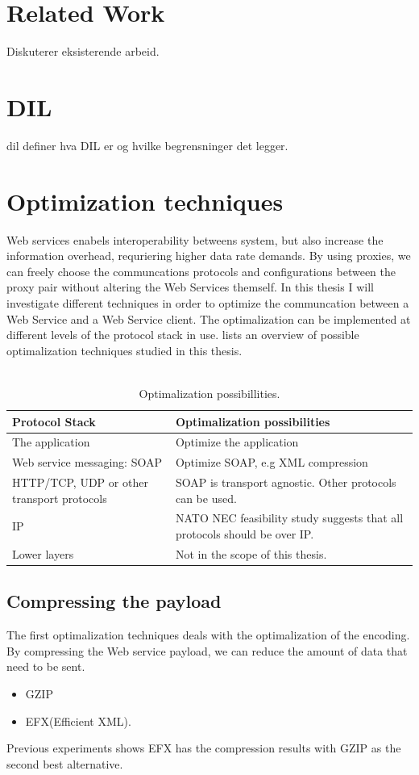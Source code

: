 \documentclass[USenglish]{article}
\begin{document}
\section{Related Work}
Diskuterer eksisterende arbeid.
\section{DIL}
\gls{dil} definer hva DIL er og hvilke begrensninger det legger.

\section{Optimization techniques}
Web services enabels interoperability betweens system, but also increase the information overhead, requriering higher data rate demands. By using proxies, we can freely choose the communcations protocols and configurations between the proxy pair without altering the Web Services themself. In this thesis I will investigate different techniques in order to optimize the communcation between a Web Service and a Web Service client. The optimalization can be implemented at different levels of the protocol stack in use.  lists an overview of possible optimalization techniques studied in this thesis.
\\ \\

\begin{table}[h]
\begin{tabularx}{\textwidth}{| X | X |}
\hline
  \textbf{Protocol Stack} & \textbf{Optimalization possibilities} \\ \hline
  The application & Optimize the application\\ \hline
  Web service messaging: SOAP & Optimize SOAP, e.g XML compression \\ \hline
  HTTP/TCP, UDP or other transport protocols & SOAP is transport agnostic. Other protocols can be used. \\ \hline
  IP & NATO NEC feasibility study suggests that all protocols should be over IP. \\ \hline
  Lower layers & Not in the scope of this thesis. \\ \hline
\end{tabularx}
\caption{Optimalization possibillities.} \label{table:optimalization-overview}
\end{table}


\subsection{Compressing the payload}
The first optimalization techniques deals with the optimalization of the encoding. By compressing the Web service payload, we can reduce the amount of data that need to be sent.
\begin{itemize}
\item GZIP
\item EFX(Efficient XML).
\end{itemize}
Previous experiments shows EFX has the compression results with GZIP as the second best alternative\cite{johnsen-trude-compression-techniqes}.
\end{document}
